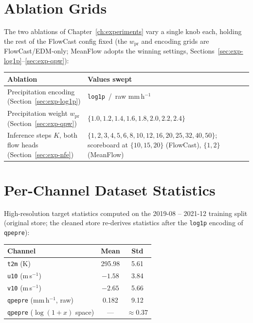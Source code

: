 \section{Ablation Grids}

The two ablations of Chapter~\ref{ch:experiments} vary a single knob each, holding the rest of the FlowCast config fixed (the $w_{\text{pr}}$ and encoding grids are FlowCast/EDM-only; MeanFlow adopts the winning settings, Sections~\ref{sec:exp-log1p}--\ref{sec:exp-qpw}):
\begin{center}
\begin{tabular}{ll}
\toprule
Ablation & Values swept \\
\midrule
Precipitation encoding (Section~\ref{sec:exp-log1p}) & \texttt{log1p} \,/\, raw mm\,h$^{-1}$ \\
Precipitation weight $w_{\text{pr}}$ (Section~\ref{sec:exp-qpw}) & $\{1.0, 1.2, 1.4, 1.6, 1.8, 2.0, 2.2, 2.4\}$ \\
Inference steps $K$, both flow heads (Section~\ref{sec:exp-nfe}) & $\{1, 2, 3, 4, 5, 6, 8, 10, 12, 16, 20, 25, 32, 40, 50\}$; scoreboard at $\{10, 15, 20\}$ (FlowCast), $\{1, 2\}$ (MeanFlow) \\
\bottomrule
\end{tabular}
\end{center}

\section{Per-Channel Dataset Statistics}

High-resolution target statistics computed on the 2019-08 -- 2021-12 training split (original store; the cleaned store re-derives statistics after the \texttt{log1p} encoding of \texttt{qpepre}):
\begin{center}
\begin{tabular}{lcc}
\toprule
Channel & Mean & Std \\
\midrule
\texttt{t2m} (K)          & 295.98 & 5.61 \\
\texttt{u10} (m\,s$^{-1}$) & $-1.58$ & 3.84 \\
\texttt{v10} (m\,s$^{-1}$) & $-2.65$ & 5.66 \\
\texttt{qpepre} (mm\,h$^{-1}$, raw) & 0.182  & 9.12 \\
\texttt{qpepre} ($\log(1+x)$ space) & --- & $\approx 0.37$ \\
\bottomrule
\end{tabular}
\end{center}
